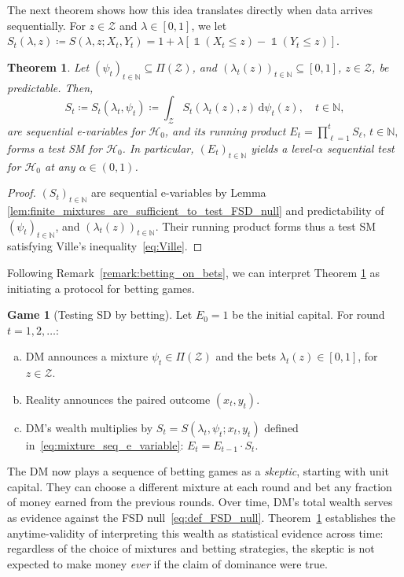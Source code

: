 \documentclass[12pt,twoside]{article}
\theoremstyle{plain}
\newtheorem{theorem}{Theorem}
\theoremstyle{definition}
\newtheorem{game}{Game}
\theoremstyle{remark}
\newcommand{\inparen}[1]{\left(#1\right)}
\DeclareMathOperator*{\indsymb}{\mathds{1}}
\newcommand{\indicator}[1]{\indsymb\inparen{#1}}
\newcommand{\N}{\mathbb{N}}
\newcommand{\calH}{\mathcal{H}}
\newcommand{\calZ}{\mathcal{Z}}
\newcommand{\diff}{\,\mathrm{d}}
\begin{document}
The next theorem shows how this idea translates directly when data arrives sequentially. 
For $z \in \calZ$ and $\lambda \in [0,1]$, we let $S_t(\lambda,z) \coloneqq S(\lambda, z; X_t, Y_t) = 1 + \lambda [\indicator{X_t \leq z} - \indicator{Y_t \leq z}]$.

    
\begin{theorem}
\label{thm:Test-supermartingale-for-the-FSD_null} 
Let $(\psi_t)_{t\in \N} \subseteq \Pi(\calZ)$, and $(\lambda_t(z))_{t\in \N} \subseteq [0,1]$, $z\in \calZ$, be predictable. Then,
 \begin{equation}\label{eq:mixture_seq_e_variable}
    S_t \coloneqq S_t(\lambda_t, \psi_t) \coloneqq \int_{\calZ} S_t(\lambda_t(z), z) \diff\psi_t( z), \quad t\in \N,
\end{equation}
are sequential e-variables for $\calH_0$, and its running product $E_t = \prod_{\ell=1}^t S_\ell,\, t\in \N,$ forms a test SM for $\calH_0$. 
In particular, $(E_t)_{t\in \N}$ yields a level-$\alpha$ sequential test for $\calH_0$ at any $\alpha \in (0,1)$.
\end{theorem}

\begin{proof}
$(S_t)_{t\in \N}$ are sequential e-variables by Lemma \ref{lem:finite_mixtures_are_sufficient_to_test_FSD_null} and predictability of $(\psi_t)_{t\in \N}$, and $(\lambda_t(z))_{t\in \N}$. 
Their running product forms thus a test SM satisfying Ville's inequality~\eqref{eq:Ville}. 
\end{proof}

Following Remark~\ref{remark:betting_on_bets}, we can interpret Theorem \ref{thm:Test-supermartingale-for-the-FSD_null} as initiating a protocol for betting games. 
\begin{game}[Testing SD by betting]\label{game:test_fsd}
    Let $E_0=1$ be the initial capital. For round $t = 1, 2, \dotsc$: 
        \begin{enumerate}[(a)]
            \item DM announces a mixture $\psi_t\in \Pi({\calZ})$ and the bets $\lambda_t(z) \in [0,1]$, for $z\in \calZ$.
            \item Reality announces the paired outcome $(x_t, y_t)$.
            \item DM's wealth multiplies by $S_t = S(\lambda_t, \psi_t; x_t, y_t)$ defined in~\eqref{eq:mixture_seq_e_variable}: $E_t= E_{t-1} \cdot S_t$. 
        \end{enumerate}
\end{game}
The DM now plays a sequence of betting games as a \emph{skeptic}, starting with unit capital. 
They can choose a different mixture at each round and bet any fraction of money earned from the previous rounds. 
Over time, DM's total wealth serves as evidence against the FSD null~\eqref{eq:def_FSD_null}. 
Theorem~\ref{thm:Test-supermartingale-for-the-FSD_null} establishes the anytime-validity of interpreting this wealth as statistical evidence across time: regardless of the choice of mixtures and betting strategies, the skeptic is not expected to make money \emph{ever} if the claim of dominance were true. 
\end{document}

